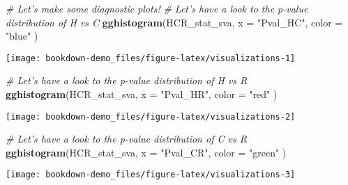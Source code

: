 \documentclass[]{book}
\newenvironment{Shaded}{\begin{snugshade}}{\end{snugshade}}
\newcommand{\CommentTok}[1]{\textcolor[rgb]{0.56,0.35,0.01}{\textit{#1}}}
\newcommand{\DataTypeTok}[1]{\textcolor[rgb]{0.13,0.29,0.53}{#1}}
\newcommand{\KeywordTok}[1]{\textcolor[rgb]{0.13,0.29,0.53}{\textbf{#1}}}
\newcommand{\NormalTok}[1]{#1}
\newcommand{\StringTok}[1]{\textcolor[rgb]{0.31,0.60,0.02}{#1}}
\begin{document}
\begin{Shaded}
\begin{Highlighting}[]

\CommentTok{# Let's make some diagnostic plots! }
\CommentTok{# Let's have a look to the p-value distribution of H vs C}
\KeywordTok{gghistogram}\NormalTok{(HCR_stat_sva, }
            \DataTypeTok{x =} \StringTok{"Pval_HC"}\NormalTok{,}
            \DataTypeTok{color =} \StringTok{"blue"}
\NormalTok{            )}
\end{Highlighting}
\end{Shaded}

\begin{center}\texttt{[image: bookdown-demo\_files/figure-latex/visualizations-1]} \end{center}

\begin{Shaded}
\begin{Highlighting}[]

\CommentTok{# Let's have a look to the p-value distribution of H vs R}
\KeywordTok{gghistogram}\NormalTok{(HCR_stat_sva, }
            \DataTypeTok{x =} \StringTok{"Pval_HR"}\NormalTok{,}
            \DataTypeTok{color =} \StringTok{"red"}
\NormalTok{            )}
\end{Highlighting}
\end{Shaded}

\begin{center}\texttt{[image: bookdown-demo\_files/figure-latex/visualizations-2]} \end{center}

\begin{Shaded}
\begin{Highlighting}[]

\CommentTok{# Let's have a look to the p-value distribution of C vs R}
\KeywordTok{gghistogram}\NormalTok{(HCR_stat_sva, }
            \DataTypeTok{x =} \StringTok{"Pval_CR"}\NormalTok{,}
            \DataTypeTok{color =} \StringTok{"green"}
\NormalTok{            )}
\end{Highlighting}
\end{Shaded}

\begin{center}\texttt{[image: bookdown-demo\_files/figure-latex/visualizations-3]} \end{center}
\end{document}
